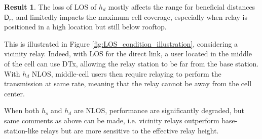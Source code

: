 \documentclass[journal]{IEEEtran}
\theoremstyle{definition}
\newtheorem{result}{Result}
\begin{document}
\vspace*{-5pt}\begin{result}
The loss of LOS of $h_d$ mostly affects the range for beneficial distances $\mathsf{D}_r$, and limitedly impacts the maximum cell coverage, especially when relay is positioned in a high location but still below rooftop.
\end{result} \vspace*{-5pt} \noindent
This is illustrated in Figure \ref{fig:LOS_condition_illustration}, considering a vicinity relay.
Indeed, with LOS for the direct link, a user located in the middle of the cell can use DTx, allowing the relay station to be far from the base station. With $h_d$ NLOS, middle-cell users then require relaying to perform the transmission at same rate, meaning that the relay cannot be away from the cell center. 


When both $h_s$ and $h_d$ are NLOS, performance are significantly degraded, but same comments as above can be made, i.e. vicinity relays outperform base-station-like relays but are more sensitive to the effective relay height.
\end{document}

